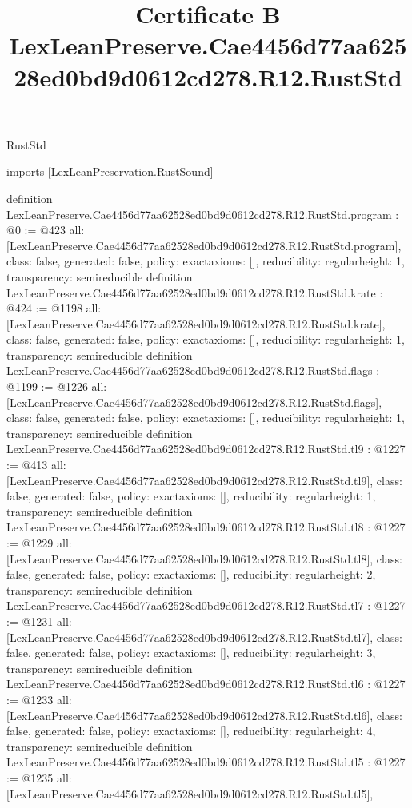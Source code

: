 \begin{lexlean}{RustStd}
\title{Certificate B LexLeanPreserve.Cae4456d77aa62528ed0bd9d0612cd278.R12.RustStd}
\begin{coremodule}
imports [LexLeanPreservation.RustSound]

definition LexLeanPreserve.Cae4456d77aa62528ed0bd9d0612cd278.R12.RustStd.program : @0 := @423 {
  all: [LexLeanPreserve.Cae4456d77aa62528ed0bd9d0612cd278.R12.RustStd.program],
  class: false,
  generated: false,
  policy: exact{axioms: []},
  reducibility: regular{height: 1},
  transparency: semireducible
}
definition LexLeanPreserve.Cae4456d77aa62528ed0bd9d0612cd278.R12.RustStd.krate : @424 := @1198 {
  all: [LexLeanPreserve.Cae4456d77aa62528ed0bd9d0612cd278.R12.RustStd.krate],
  class: false,
  generated: false,
  policy: exact{axioms: []},
  reducibility: regular{height: 1},
  transparency: semireducible
}
definition LexLeanPreserve.Cae4456d77aa62528ed0bd9d0612cd278.R12.RustStd.flags : @1199 := @1226 {
  all: [LexLeanPreserve.Cae4456d77aa62528ed0bd9d0612cd278.R12.RustStd.flags],
  class: false,
  generated: false,
  policy: exact{axioms: []},
  reducibility: regular{height: 1},
  transparency: semireducible
}
definition LexLeanPreserve.Cae4456d77aa62528ed0bd9d0612cd278.R12.RustStd.tl9 : @1227 := @413 {
  all: [LexLeanPreserve.Cae4456d77aa62528ed0bd9d0612cd278.R12.RustStd.tl9],
  class: false,
  generated: false,
  policy: exact{axioms: []},
  reducibility: regular{height: 1},
  transparency: semireducible
}
definition LexLeanPreserve.Cae4456d77aa62528ed0bd9d0612cd278.R12.RustStd.tl8 : @1227 := @1229 {
  all: [LexLeanPreserve.Cae4456d77aa62528ed0bd9d0612cd278.R12.RustStd.tl8],
  class: false,
  generated: false,
  policy: exact{axioms: []},
  reducibility: regular{height: 2},
  transparency: semireducible
}
definition LexLeanPreserve.Cae4456d77aa62528ed0bd9d0612cd278.R12.RustStd.tl7 : @1227 := @1231 {
  all: [LexLeanPreserve.Cae4456d77aa62528ed0bd9d0612cd278.R12.RustStd.tl7],
  class: false,
  generated: false,
  policy: exact{axioms: []},
  reducibility: regular{height: 3},
  transparency: semireducible
}
definition LexLeanPreserve.Cae4456d77aa62528ed0bd9d0612cd278.R12.RustStd.tl6 : @1227 := @1233 {
  all: [LexLeanPreserve.Cae4456d77aa62528ed0bd9d0612cd278.R12.RustStd.tl6],
  class: false,
  generated: false,
  policy: exact{axioms: []},
  reducibility: regular{height: 4},
  transparency: semireducible
}
definition LexLeanPreserve.Cae4456d77aa62528ed0bd9d0612cd278.R12.RustStd.tl5 : @1227 := @1235 {
  all: [LexLeanPreserve.Cae4456d77aa62528ed0bd9d0612cd278.R12.RustStd.tl5],
}
\end{coremodule}
\end{lexlean}
